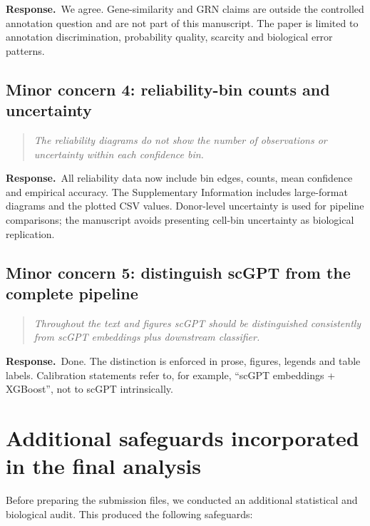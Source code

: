 \documentclass[11pt,a4paper]{article}
\newcommand{\commenttext}[1]{\begin{quote}\itshape #1\end{quote}}
\newcommand{\responsehead}{\par\noindent\textbf{Response.}\ }
\begin{document}
\responsehead We agree. Gene-similarity and GRN claims are outside the controlled annotation question and are not part of this manuscript. The paper is limited to annotation discrimination, probability quality, scarcity and biological error patterns.

\subsection*{Minor concern 4: reliability-bin counts and uncertainty}

\commenttext{The reliability diagrams do not show the number of observations or uncertainty within each confidence bin.}

\responsehead All reliability data now include bin edges, counts, mean confidence and empirical accuracy. The Supplementary Information includes large-format diagrams and the plotted CSV values. Donor-level uncertainty is used for pipeline comparisons; the manuscript avoids presenting cell-bin uncertainty as biological replication.

\subsection*{Minor concern 5: distinguish scGPT from the complete pipeline}

\commenttext{Throughout the text and figures scGPT should be distinguished consistently from scGPT embeddings plus downstream classifier.}

\responsehead Done. The distinction is enforced in prose, figures, legends and table labels. Calibration statements refer to, for example, ``scGPT embeddings + XGBoost'', not to scGPT intrinsically.

\section*{Additional safeguards incorporated in the final analysis}

Before preparing the submission files, we conducted an additional statistical and biological audit. This produced the following safeguards:
\end{document}
